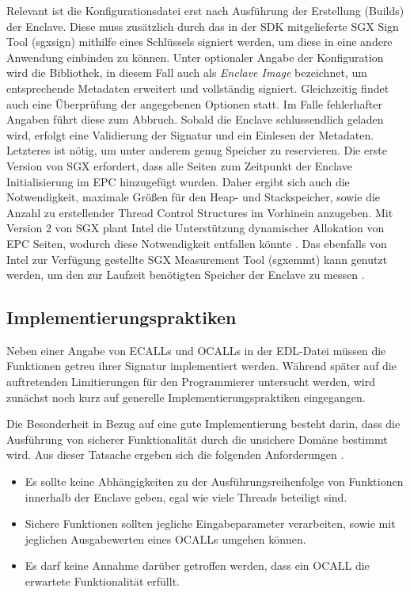 Relevant ist die Konfigurationsdatei erst nach Ausführung der Erstellung (Builds) der Enclave. Diese muss zusätzlich durch das in der SDK mitgelieferte SGX Sign Tool (sgx\textunderscore sign) mithilfe eines Schlüssels signiert werden, um diese in eine andere Anwendung einbinden zu können. Unter optionaler Angabe der Konfiguration wird die Bibliothek, in diesem Fall auch als \textit{Enclave Image} bezeichnet, um entsprechende Metadaten erweitert und vollständig signiert. Gleichzeitig findet auch eine Überprüfung der angegebenen Optionen statt. Im Falle fehlerhafter Angaben führt diese zum Abbruch. Sobald die Enclave schlussendlich geladen wird, erfolgt eine Validierung der Signatur und ein Einlesen der Metadaten. Letzteres ist nötig, um unter anderem genug Speicher zu reservieren. Die erste Version von SGX erfordert, dass alle Seiten zum Zeitpunkt der Enclave Initialisierung im EPC hinzugefügt wurden. Daher ergibt sich auch die Notwendigkeit, maximale Größen für den Heap- und Stackspeicher, sowie die Anzahl zu erstellender Thread Control Structures im Vorhinein anzugeben. Mit Version 2 von SGX plant Intel die Unterstützung dynamischer Allokation von EPC Seiten, wodurch diese Notwendigkeit entfallen könnte \cite{McKeen2016}. Das ebenfalls von Intel zur Verfügung gestellte SGX Measurement Tool (sgx\textunderscore emmt) kann genutzt werden, um den zur Laufzeit benötigten Speicher der Enclave zu messen \cite{WinDev}.

%

\subsection{Implementierungspraktiken}

Neben einer Angabe von ECALLs und OCALLs in der EDL-Datei müssen die Funktionen getreu ihrer Signatur implementiert werden. Während später auf die auftretenden Limitierungen für den Programmierer untersucht werden, wird zunächst noch kurz auf generelle Implementierungspraktiken eingegangen. 

Die Besonderheit in Bezug auf eine gute Implementierung besteht darin, dass die Ausführung von sicherer Funktionalität durch die unsichere Domäne bestimmt wird. Aus dieser Tatsache ergeben sich die folgenden Anforderungen \cite{WinGuide}.

\begin{itemize}
	\item Es sollte keine Abhängigkeiten zu der Ausführungsreihenfolge von Funktionen innerhalb der Enclave geben, egal wie viele Threads beteiligt sind.
	\item Sichere Funktionen sollten jegliche Eingabeparameter verarbeiten, sowie mit jeglichen Ausgabewerten eines OCALLs umgehen können.
	\item Es darf keine Annahme darüber getroffen werden, dass ein OCALL die erwartete Funktionalität erfüllt.
\end{itemize}

